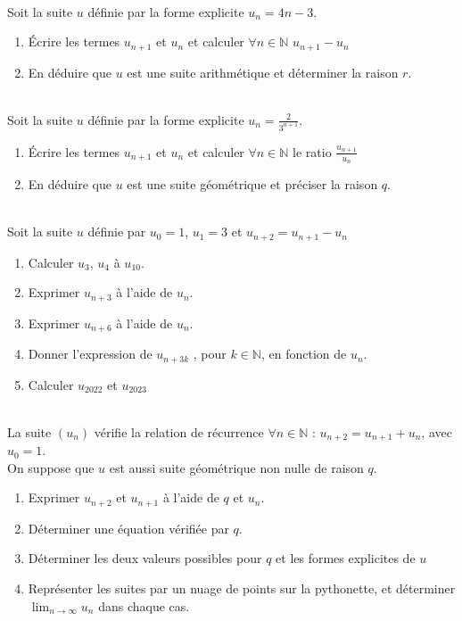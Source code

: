 \documentclass[main.tex]{subfiles}
\begin{document}
\begin{exercise}\label{chapter05:exercise:suites19} \hfill \\   
	Soit la suite $u$ définie par la forme explicite $u_n=4n-3$.  
	\begin{enumerate}[label=\arabic*),leftmargin=*]
		\item Écrire les termes $u_{n+1}$ et $u_n$ et calculer   $\forall n\in\mathbb{N}$ $u_{n+1}-u_n$
		\item En déduire que $u$ est une suite arithmétique et déterminer la raison $r$. 
	\end{enumerate}
\end{exercise}
\begin{exercise} \label{chapter05:exercise:suites20}  \hfill \\
	Soit la suite $u$ définie par la forme explicite $u_n=\tfrac{2}{3^{n+1}}$.
	\begin{enumerate}[label=\arabic*),leftmargin=*]
		\item Écrire les termes $u_{n+1}$ et $u_n$ et calculer  $\forall n\in\mathbb{N}$ le ratio $\frac{u_{n+1}}{u_n}$
		\item En déduire que $u$ est une suite géométrique et préciser la raison $q$.
	\end{enumerate} 
\end{exercise}
\begin{exercise}\label{chapter05:exercise:suites21}  \hfill \\
	Soit la suite $u$ définie par $u_0=1$, $u_1=3$ et $u_{n+2}=u_{n+1}-u_n$
	\begin{enumerate}[label=\arabic*),leftmargin=*] 
		\item Calculer $u_3$, $u_4$ à $u_{10}$.
		\item Exprimer $u_{n+3}$ à l'aide de $u_n$.
		\item Exprimer $u_{n+6}$ à l'aide de $u_n$.
		\item Donner l'expression de $u_{n+3k}$ , pour $k\in\mathbb{N}$, en fonction de $u_n$.
		\item Calculer $u_{2022}$ et $u_{2023}$
	\end{enumerate} 
\end{exercise}
\begin{exercise} \label{chapter05:exercise:suites22}   \hfill \\
La suite $(u_n)$ vérifie la relation de récurrence $\forall n\in\mathbb{N}$ : $u_{n+2}=u_{n+1}+u_n$, avec $u_0=1$.\\ On suppose  que $u$ est aussi suite géométrique non nulle de raison $q$. 
\begin{enumerate}[label=\arabic*),leftmargin=*]
	\item Exprimer $u_{n+2}$ et $u_{n+1}$ à l'aide de $q$ et $u_n$.
	\item Déterminer une équation vérifiée par $q$.
	\item Déterminer les deux valeurs possibles pour $q$ et les formes explicites de $u$
	\item Représenter les suites par un nuage de points sur la pythonette, et déterminer $\lim_{n\to\infty}u_n$ dans chaque cas.  
\end{enumerate} 
\end{exercise} 
\end{document}
